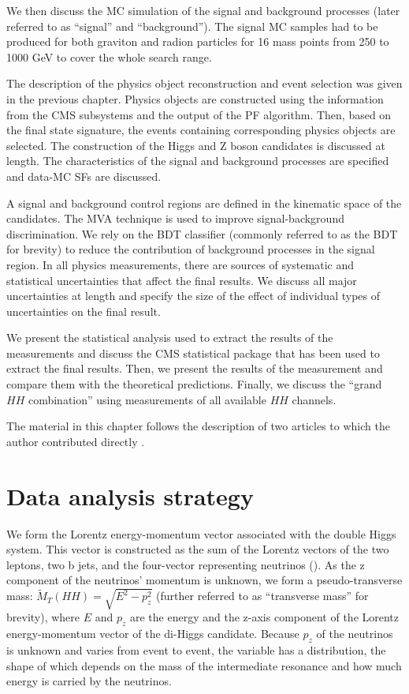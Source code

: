We then discuss the MC simulation of the signal and background processes (later referred to as ``signal'' and ``background''). The signal MC samples had to be produced for both graviton and radion particles for 16 mass points from 250 to 1000 GeV to cover the whole search range. 

The description of the physics object reconstruction and event selection was given in the previous chapter. Physics objects are constructed using the information from the CMS subsystems and the output of the PF algorithm. Then, based on the final state signature, the events containing corresponding physics objects are selected. The construction of the Higgs and Z boson candidates is discussed at length. The characteristics of the signal and background processes are specified and data-MC SFs are discussed.

A signal and background control regions are defined in the kinematic space of the candidates. The MVA technique is used to improve signal-background discrimination. We rely on the BDT classifier (commonly referred to as the BDT for brevity) to reduce the contribution of background processes in the signal region. In all physics measurements, there are sources of systematic and statistical uncertainties that affect the final results. We discuss all major uncertainties at length and specify the size of the effect of individual types of uncertainties on the final result. 

We present the statistical analysis used to extract the results of the measurements and discuss the CMS statistical package that has been used to extract the final results. Then, we present the results of the measurement and compare them with the theoretical predictions. Finally, we discuss the ``grand $HH$ combination'' using measurements of all available $HH$ channels.

The material in this chapter follows the description of two articles to which the author contributed directly \cite{bbZZAN, CMS-PAS-HIG-17-032}.

\section{Data analysis strategy}
\label{sec:strategy}
We form the Lorentz energy-momentum vector associated with the double Higgs system. This vector is constructed as the sum of the Lorentz vectors of the two leptons, two b jets, and the four-vector representing neutrinos (\PTslash). As the z component of the neutrinos' momentum is unknown, we form a pseudo-transverse mass:
$\tilde{M}_T(HH) = \sqrt{E^2 - p_{z}^2}$ (further referred to as ``transverse mass'' for brevity), where $E$ and $p_z$ are the energy and the z-axis component of the Lorentz energy-momentum vector of the di-Higgs candidate. Because $p_z$ of the neutrinos is unknown and varies from event to event, the variable \mTHH has a distribution, the shape of which depends on the mass of the intermediate resonance and how much energy is carried by the neutrinos.

